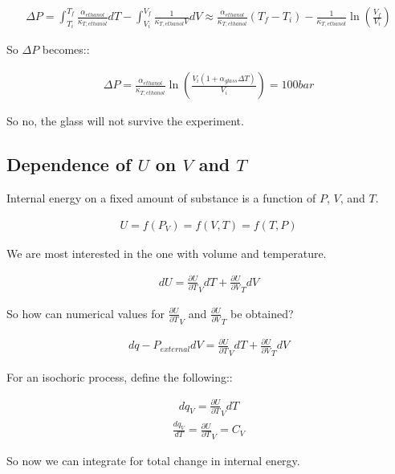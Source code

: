 \documentclass[12pt]{book}
\begin{document}
\begin{align*}
    \Delta P=\int_{T_i}^{T_f}\frac{\alpha_{ethanol}}{\kappa_{T,ethanol}}dT-\int_{V_i}^{V_f}\frac{1}{\kappa_{T,ethanol}V}dV\approx \frac{\alpha_{ethanol}}{\kappa_{T,ethanol}}(T_f-T_i)-\frac{1}{\kappa_{T,ethanol}}\ln(\frac{V_f}{V_i})
\end{align*}

So $\Delta P$ becomes::

\begin{align*}
    \Delta P=\frac{\alpha_{ethanol}}{\kappa_{T,ethanol}}\ln(\frac{V_i(1+\alpha_{glass}\Delta T)}{V_i})=100bar
\end{align*}

So no, the glass will not survive the experiment.

\subsection*{Dependence of $U$ on $V$ and $T$}

Internal energy on a fixed amount of substance is a function of $P$, $V$, and $T$.

\begin{align*}
    U=f(P_V)=f(V,T)=f(T,P)
\end{align*}

We are most interested in the one with volume and temperature.

\begin{align*}
    dU=\frac{\partial U}{\partial T}_V dT+\frac{\partial U}{\partial V}_T dV
\end{align*}

So how can numerical values for $\frac{\partial U}{\partial T}_V$ and $\frac{\partial U}{\partial V}_T$ be obtained?

\begin{align*}
    dq-P_{external}dV=\frac{\partial U}{\partial T}_V dT+\frac{\partial U}{\partial V}_T dV
\end{align*}

For an isochoric process, define the following::

\begin{align*}
    dq_V=\frac{\partial U}{\partial T}_V dT
\end{align*}
\begin{align*}
    \frac{dq_V}{dT}=\frac{\partial U}{\partial T}_V=C_V
\end{align*}

So now we can integrate for total change in internal energy.
\end{document}
